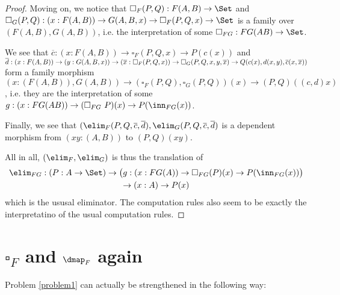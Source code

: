 \documentclass{article}
\begin{document}
\begin{proof}
Moving on, we notice that $\square_F(P, Q) : F(A, B) \to \Set$ and
$\square_G(P, Q) : \\ (x : F(A, B)) \to G(A, B, x) \to \square_F(P, Q,
x) \to \Set$ is a family over $(F(A,B), G(A,B))$, i.e. the
interpretation of some $\square_{FG} : FG(AB) \to \Set$.

We see that $\overline{c} : (x : F(A, B)) \to
\square_F(P, Q, x) \to P(c(x))$ and $\overline{d} : (x : F(A, B)) \\ \to
(y : G(A, B, x)) \to (\overline{x} : \square_F(P, Q, x)) \to
\square_G(P, Q, x, y, \overline{x}) \to Q(c(x), d(x, y),
\overline{c}(x, \overline{x}))$ form a family morphism $(x : (F(A, B)), G(A, B)) \to (\square_F(P, Q), \square_G(P, Q))(x) \to
(P, Q)((c, d)x)$, i.e. they are the interpretation of
some $g : (x : FG(AB)) \to (\square_{FG}\ P)(x) \to P(\inn_{FG}(x))$.


Finally, we see that $(\elim_F(P, Q,
\overline{c}, \overline{d}), \elim_G(P, Q, \overline{c},
\overline{d})$ is a dependent morphism from $(xy : (A, B))$ to $(P,
Q)(xy)$.

All in all, $(\elim_F, \elim_G)$ is thus the translation of 
\begin{multline*}
\elim_{FG} : (P : A \to \Set) \to \big(g : (x : FG(A)) \to \square_{FG}(P)(x) \to P(\inn_{FG}(x))\big) \\ \to (x : A) \to P(x)
\end{multline*}
which is the ususal eliminator. The computation rules also seem to be
exactly the interpretatino of the usual computation rules.
\end{proof}

\section*{$\square_F$ and $\dmap_F$ again}

Problem \ref{problem1} can actually be strengthened in the following way:
\end{document}
